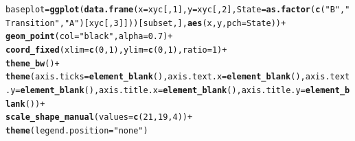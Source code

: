 \documentclass{article}\usepackage[]{graphicx}\usepackage[]{color}
\makeatletter
\newcommand{\hlnum}[1]{\textcolor[rgb]{0.686,0.059,0.569}{#1}}%
\newcommand{\hlstr}[1]{\textcolor[rgb]{0.192,0.494,0.8}{#1}}%
\newcommand{\hlopt}[1]{\textcolor[rgb]{0,0,0}{#1}}%
\newcommand{\hlstd}[1]{\textcolor[rgb]{0.345,0.345,0.345}{#1}}%
\newcommand{\hlkwb}[1]{\textcolor[rgb]{0.69,0.353,0.396}{#1}}%
\newcommand{\hlkwc}[1]{\textcolor[rgb]{0.333,0.667,0.333}{#1}}%
\newcommand{\hlkwd}[1]{\textcolor[rgb]{0.737,0.353,0.396}{\textbf{#1}}}%
\newenvironment{kframe}{%
 \def\at@end@of@kframe{}%
 \ifinner\ifhmode%
  \def\at@end@of@kframe{\end{minipage}}%
  \begin{minipage}{\columnwidth}%
 \fi\fi%
 \def\FrameCommand##1{\hskip\@totalleftmargin \hskip-\fboxsep
 \colorbox{shadecolor}{##1}\hskip-\fboxsep
     \hskip-\linewidth \hskip-\@totalleftmargin \hskip\columnwidth}%
 \MakeFramed {\advance\hsize-\width
   \@totalleftmargin\z@ \linewidth\hsize
   \@setminipage}}%
 {\par\unskip\endMakeFramed%
 \at@end@of@kframe}
\newenvironment{knitrout}{}{} %
\makeatother
\begin{document}
\begin{knitrout}
\color{fgcolor}\begin{kframe}
\begin{alltt}
\hlstd{baseplot} \hlkwb{=} \hlkwd{ggplot}\hlstd{(}\hlkwd{data.frame}\hlstd{(}\hlkwc{x} \hlstd{= xyc[,}\hlnum{1}\hlstd{],} \hlkwc{y} \hlstd{= xyc[,}\hlnum{2}\hlstd{],} \hlkwc{State} \hlstd{=} \hlkwd{as.factor}\hlstd{(}\hlkwd{c}\hlstd{(}\hlstr{"B"}\hlstd{,} \hlstr{"Transition"}\hlstd{,} \hlstr{"A"}\hlstd{)[xyc[,}\hlnum{3}\hlstd{]]))[subset,],} \hlkwd{aes}\hlstd{(x, y,} \hlkwc{pch} \hlstd{= State))} \hlopt{+}
        \hlkwd{geom_point}\hlstd{(}\hlkwc{col} \hlstd{=} \hlstr{"black"}\hlstd{,} \hlkwc{alpha} \hlstd{=} \hlnum{0.7}\hlstd{)} \hlopt{+}
        \hlkwd{coord_fixed}\hlstd{(}\hlkwc{xlim} \hlstd{=} \hlkwd{c}\hlstd{(}\hlnum{0}\hlstd{,} \hlnum{1}\hlstd{),} \hlkwc{ylim} \hlstd{=} \hlkwd{c}\hlstd{(}\hlnum{0}\hlstd{,} \hlnum{1}\hlstd{),} \hlkwc{ratio} \hlstd{=} \hlnum{1}\hlstd{)} \hlopt{+}
        \hlkwd{theme_bw}\hlstd{()} \hlopt{+}
        \hlkwd{theme}\hlstd{(}\hlkwc{axis.ticks} \hlstd{=} \hlkwd{element_blank}\hlstd{(),} \hlkwc{axis.text.x} \hlstd{=} \hlkwd{element_blank}\hlstd{(),} \hlkwc{axis.text.y} \hlstd{=} \hlkwd{element_blank}\hlstd{(),} \hlkwc{axis.title.x} \hlstd{=} \hlkwd{element_blank}\hlstd{(),} \hlkwc{axis.title.y} \hlstd{=} \hlkwd{element_blank}\hlstd{())} \hlopt{+}
        \hlkwd{scale_shape_manual}\hlstd{(}\hlkwc{values} \hlstd{=} \hlkwd{c}\hlstd{(}\hlnum{21}\hlstd{,} \hlnum{19}\hlstd{,} \hlnum{4}\hlstd{))} \hlopt{+}
        \hlkwd{theme}\hlstd{(}\hlkwc{legend.position}\hlstd{=}\hlstr{"none"}\hlstd{)}



\end{alltt}
\end{kframe}
\end{knitrout}
\end{document}
